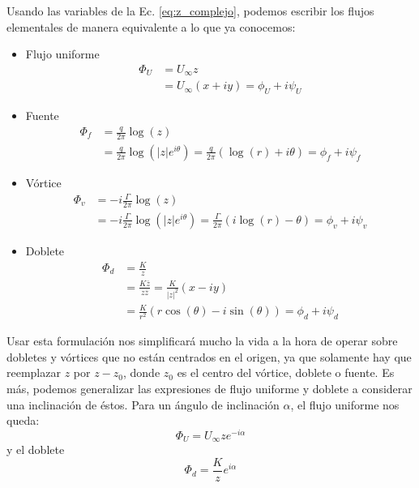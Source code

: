 Usando las variables de la Ec. \eqref{eq:z_complejo}, podemos escribir los flujos elementales de manera equivalente a lo que ya conocemos:
%
\begin{itemize}
\item Flujo uniforme
%
\begin{align}\label{eq:flujo_uniforme_complejo}
\Phi_U &= U_\infty z\nonumber\\
       &= U_\infty (x+iy) = \phi_U + i\psi_U
\end{align}
%
\item Fuente
%
\begin{align}\label{eq:fuente_complejo}
\Phi_f &= \frac{q}{2\pi} \log(z)\nonumber\\
       &= \frac{q}{2\pi} \log\left(|z|e^{i\theta}\right) = \frac{q}{2\pi} \left(\log(r) + i\theta\right) = \phi_f + i\psi_f
\end{align}
%
\item Vórtice
%
\begin{align}\label{eq:vortice_complejo}
\Phi_v &= -i\frac{\Gamma}{2\pi} \log(z)\nonumber\\
       &= -i\frac{\Gamma}{2\pi} \log\left(|z|e^{i\theta}\right) = \frac{\Gamma}{2\pi} \left(i\log(r) - \theta\right) = \phi_v + i\psi_v
\end{align}
%
\item Doblete
%
\begin{align}\label{eq:doblete_complejo}
\Phi_d &= \frac{K}{z} \nonumber\\
       &= \frac{K\overline{z}}{z\overline{z}} = \frac{K}{|z|^2}(x-iy)\nonumber\\ 
       &= \frac{K}{r^2}(r\cos(\theta) - i\sin(\theta)) = \phi_d + i\psi_d
\end{align}

\end{itemize}

Usar esta formulación nos simplificará mucho la vida a la hora de operar sobre dobletes y vórtices que no están centrados en el origen, ya que solamente hay que reemplazar $z$ por $z-z_0$, donde $z_0$ es el centro del vórtice, doblete o fuente.
Es más, podemos generalizar las expresiones de flujo uniforme y doblete a considerar una inclinación de éstos. 
Para un ángulo de inclinación $\alpha$, el flujo uniforme nos queda:
%
\begin{equation} \label{eq:flujo_uniforme_complejo_angulo}
\Phi_U = U_\infty z e^{-i\alpha}
\end{equation}
%
y el doblete
\begin{equation} \label{eq:doblete_complejo_angulo}
\Phi_d = \frac{K}{z}e^{i\alpha} 
\end{equation}

